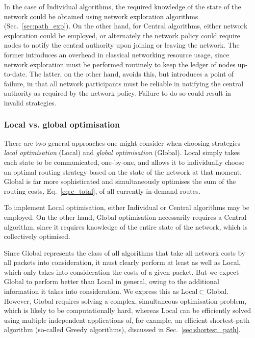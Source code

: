 \documentclass[aps,rmp,twocolumn,amsmath,amssymb,nofootinbib,superscriptaddress]{revtex4}
\begin{document}
In the case of {\sc Individual} algorithms, the required knowledge of the state of the network could be obtained using network exploration algorithms (Sec.~\ref{sec:path_exp}). On the other hand, for {\sc Central} algorithms, either network exploration could be employed, or alternately the network policy could require nodes to notify the central authority upon joining or leaving the network. The former introduces an overhead in classical networking resource usage, since network exploration must be performed routinely to keep the ledger of nodes up-to-date. The latter, on the other hand, avoids this, but introduces a point of failure, in that all network participants must be reliable in notifying the central authority as required by the network policy. Failure to do so could result in invalid strategies.

%
%

\subsubsection{Local vs. global optimisation}

There are two general approaches one might consider when choosing strategies -- \emph{local optimisation} ({\sc Local}) and \emph{global optimisation} ({\sc Global}). {\sc Local} simply takes each state to be communicated, one-by-one, and allows it to individually choose an optimal routing strategy based on the state of the network at that moment. {\sc Global} is far more sophisticated and simultaneously optimises the sum of the routing costs, Eq.~\ref{eq:c_total}, of all currently in-demand routes.

To implement {\sc Local} optimisation, either {\sc Individual} or {\sc Central} algorithms may be employed. On the other hand, {\sc Global} optimisation necessarily requires a {\sc Central} algorithm, since it requires knowledge of the entire state of the network, which is collectively optimised.

Since {\sc Global} represents the class of all algorithms that take all network costs by all packets into consideration, it must clearly perform at least as well as {\sc Local}, which only takes into consideration the costs of a given packet. But we expect {\sc Global} to perform better than {\sc Local} in general, owing to the additional information it takes into consideration. We express this as \mbox{{\sc Local}$\subset${\sc Global}}. However, {\sc Global} requires solving a complex, simultaneous optimisation problem, which is likely to be computationally hard, whereas {\sc Local} can be efficiently solved using multiple independent applications of, for example, an efficient shortest-path algorithm (so-called {\sc Greedy} algorithms), discussed in Sec.~\ref{sec:shortest_path}.
\end{document}
